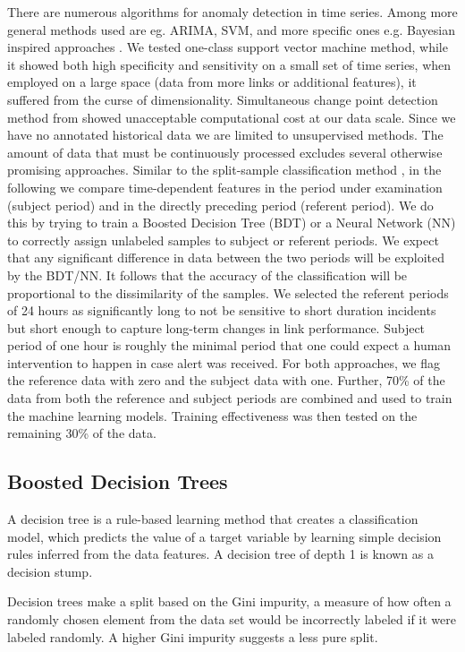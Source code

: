 \documentclass[5p]{elsarticle}
\begin{document}
There are numerous algorithms for anomaly detection in time series. Among more general methods used are eg. ARIMA, SVM, and more specific ones e.g. Bayesian inspired approaches \cite{sedam}. We tested one-class support vector machine method, while it showed both high specificity and sensitivity on a small set of time series, when employed on a large space (data from more links or additional features), it suffered from the curse of dimensionality. Simultaneous change point detection method from \cite{sedam} showed unacceptable computational cost at our data scale.
Since we have no annotated historical data we are limited to unsupervised methods. The amount of data that must be continuously processed excludes several otherwise promising approaches. 
Similar to the split-sample classification method \cite{six}, in the following we compare time-dependent features in the period under examination (subject period) and in the directly preceding period (referent period). We do this by trying to train a Boosted Decision Tree (BDT)\cite{eleven} or a Neural Network (NN) to correctly assign unlabeled samples to subject or referent periods.  We expect that any significant difference in data between the two periods will be exploited by the BDT/NN. It follows that the accuracy of the classification will be proportional to the dissimilarity of the samples. We selected the referent periods of 24 hours as significantly long to not be sensitive to short duration incidents but short enough to capture long-term changes in link performance. Subject period of one hour is roughly the minimal period that one could expect a human intervention to happen in case alert was received. For both approaches, we flag the reference data with zero and the subject data with one.  Further, 70\% of the data from both the reference and subject periods are combined and used to train the machine learning models. Training effectiveness was then tested on the remaining 30\% of the data.

\subsection{Boosted Decision Trees}

A decision tree is a rule-based learning method \cite{two} that creates a classification model, which predicts the value of a target variable by learning simple decision rules inferred from the data features. A decision tree of depth 1 is known as a decision stump.

Decision trees make a split based on the Gini impurity, a measure of how often a randomly chosen element from the data set would be incorrectly labeled if it were labeled randomly. A higher Gini impurity suggests a less pure split.
\end{document}
